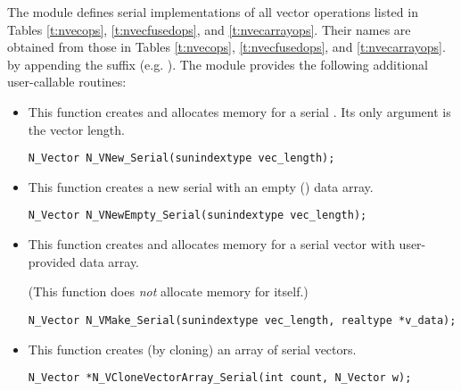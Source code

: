The {\nvecs} module defines serial implementations of all vector operations listed 
in Tables \ref{t:nvecops}, \ref{t:nvecfusedops}, and \ref{t:nvecarrayops}. Their
names are obtained from those in Tables \ref{t:nvecops}, \ref{t:nvecfusedops}, and \ref{t:nvecarrayops}.
by appending the suffix  (e.g. ).
The module {\nvecs} provides the following additional user-callable routines:
\begin{itemize}


\item {}

  This function creates and allocates memory for a serial .
  Its only argument is the vector length.

  

  \verb|N_Vector N_VNew_Serial(sunindextype vec_length);|


\item {}

  This function creates a new serial  with an empty () data array.

  

  \verb|N_Vector N_VNewEmpty_Serial(sunindextype vec_length);|


\item {}

 This function creates and allocates memory for a serial vector
 with user-provided data array.

 (This function does {\em not} allocate memory for  itself.)

 \verb|N_Vector N_VMake_Serial(sunindextype vec_length, realtype *v_data);|


\item {}

 This function creates (by cloning) an array of  serial vectors.

 

 \verb|N_Vector *N_VCloneVectorArray_Serial(int count, N_Vector w);|



\end{itemize}
